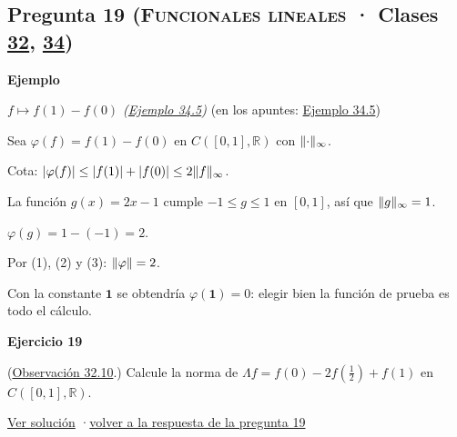 \documentclass[11pt,a4paper]{article}
\newcommand{\R}{\mathbb{R}}\newcommand{\N}{\mathbb{N}}\newcommand{\Q}{\mathbb{Q}}
\newcommand{\bloque}[1]{\par\smallskip\noindent\textbf{\color{acento}#1}\par}
\begin{document}
\subsection*{\hypertarget{e-19}{}Pregunta 19 \normalfont\small(\textsc{Funcionales lineales} · Clases \href{https://decostruttivismo.github.io/MAT2514-repaso/pdf/MAT2514_apuntes_completos.pdf\#nameddest=section.32}{32}, \href{https://decostruttivismo.github.io/MAT2514-repaso/pdf/MAT2514_apuntes_completos.pdf\#nameddest=section.34}{34})}
\bloque{Ejemplo}
\textit{$f\mapsto f(1)-f(0)$ (\href{https://decostruttivismo.github.io/MAT2514-repaso/pdf/MAT2514_apuntes_completos.pdf\#nameddest=teorema.34.5}{Ejemplo 34.5})} {\small(en los apuntes: \href{https://decostruttivismo.github.io/MAT2514-repaso/pdf/MAT2514_apuntes_completos.pdf\#nameddest=teorema.34.5}{Ejemplo 34.5})}
\begin{pasos}
\item[] Sea $\varphi(f)=f(1)-f(0)$ en $C([0,1],\R)$ con $\lVert \cdot\rVert_\infty$.
\item[(1)] Cota: $\lvert \varphi(f)\rvert\le\lvert f(1)\rvert+\lvert f(0)\rvert\le2\lVert f\rVert_\infty$.
\item[(2)] La función $g(x)=2x-1$ cumple $-1\le g\le1$ en $[0,1]$, así que $\lVert g\rVert_\infty=1$.
\item[(3)] $\varphi(g)=1-(-1)=2$.
\item[] Por (1), (2) y (3): $\lVert \varphi\rVert=2$.
\item[] Con la constante $\mathbf 1$ se obtendría $\varphi(\mathbf 1)=0$: elegir bien la función de prueba es todo el cálculo.
\end{pasos}
\bloque{\hypertarget{x-19}{}Ejercicio 19}
(\href{https://decostruttivismo.github.io/MAT2514-repaso/pdf/MAT2514_apuntes_completos.pdf\#nameddest=teorema.32.10}{Observación 32.10}.) Calcule la norma de $\Lambda f=f(0)-2f(\frac12)+f(1)$ en $C([0,1],\R)$.
\par{\small \hyperlink{s-19}{Ver solución} \quad·\quad \hyperlink{r-19}{volver a la respuesta de la pregunta 19}}
\end{document}
